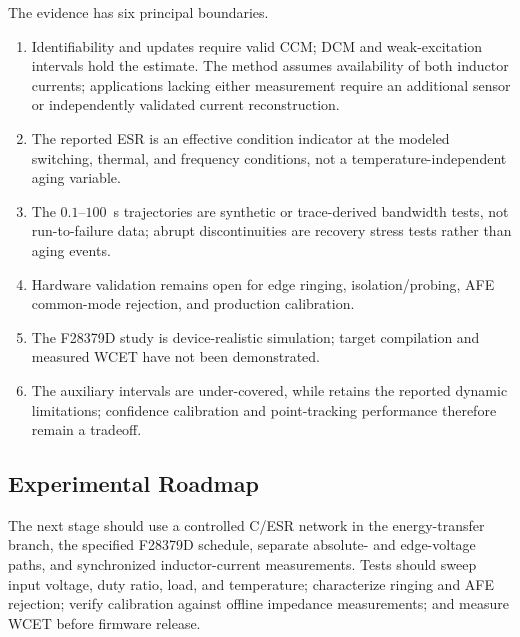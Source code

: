 The evidence has six principal boundaries.
\begin{enumerate}
\item Identifiability and updates require valid CCM; DCM and weak-excitation intervals hold the estimate. The method assumes availability of both inductor currents; applications lacking either measurement require an additional sensor or independently validated current reconstruction.
\item The reported ESR is an effective condition indicator at the modeled switching, thermal, and frequency conditions, not a temperature-independent aging variable.
\item The $0.1$--$100$~s trajectories are synthetic or trace-derived bandwidth tests, not run-to-failure data; abrupt discontinuities are recovery stress tests rather than aging events.
\item Hardware validation remains open for edge ringing, isolation/probing, AFE common-mode rejection, and production calibration.
\item The F28379D study is device-realistic simulation; target compilation and measured WCET have not been demonstrated.
\item The auxiliary \TSRLS{} intervals are under-covered, while \TSKF{} retains the reported dynamic limitations; confidence calibration and point-tracking performance therefore remain a tradeoff.
\end{enumerate}

\subsection{Experimental Roadmap}

The next stage should use a controlled C/ESR network in the energy-transfer branch, the specified F28379D schedule, separate absolute- and edge-voltage paths, and synchronized inductor-current measurements. Tests should sweep input voltage, duty ratio, load, and temperature; characterize ringing and AFE rejection; verify calibration against offline impedance measurements; and measure WCET before firmware release.
